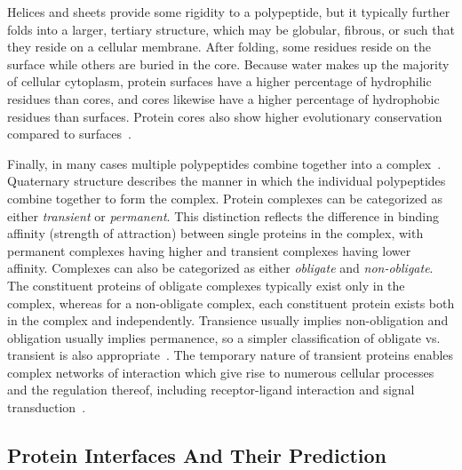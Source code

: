 Helices and sheets provide some rigidity to a polypeptide, but it typically further folds into a larger, tertiary structure, which may be globular, fibrous, or such that they reside on a cellular membrane.
After folding, some residues reside on the surface while others are buried in the core.
Because water makes up the majority of cellular cytoplasm, protein surfaces have a higher percentage of hydrophilic residues than cores, and cores likewise have a higher percentage of hydrophobic residues than surfaces. 
Protein cores also show higher evolutionary conservation compared to surfaces~\cite{yan2008}.


Finally, in many cases multiple polypeptides combine together into a complex~\cite{scheeffink2003}.
Quaternary structure describes the manner in which the individual polypeptides combine together to form the complex.
Protein complexes can be categorized as either \textit{transient} or \textit{permanent}.
This distinction reflects the difference in binding affinity (strength of attraction) between single proteins in the complex, with permanent complexes having higher and transient complexes having lower affinity.
Complexes can also be categorized as either \textit{obligate} and \textit{non-obligate}.
The constituent proteins of obligate complexes typically exist only in the complex, whereas for a non-obligate complex, each constituent protein exists both in the complex and independently.
Transience usually implies non-obligation and obligation usually implies permanence, so a simpler classification of obligate vs. transient is also appropriate~\cite{jones1996, perkins2010}.
The temporary nature of transient proteins enables complex networks of interaction which give rise to numerous cellular processes and the regulation thereof, including receptor-ligand interaction and signal transduction~\cite{perkins2010, ofran2003}.


\subsection{Protein Interfaces And Their Prediction}


